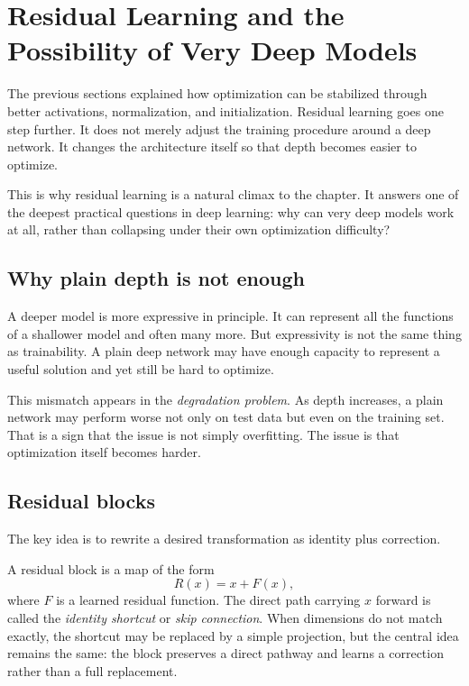 \section{Residual Learning and the Possibility of Very Deep Models}
\thispagestyle{plain}

The previous sections explained how optimization can be stabilized through better activations, normalization, and initialization.
Residual learning goes one step further.
It does not merely adjust the training procedure around a deep network.
It changes the architecture itself so that depth becomes easier to optimize.

\medskip

This is why residual learning is a natural climax to the chapter.
It answers one of the deepest practical questions in deep learning:
why can very deep models work at all, rather than collapsing under their own optimization difficulty?

\subsection*{Why plain depth is not enough}

A deeper model is more expressive in principle.
It can represent all the functions of a shallower model and often many more.
But expressivity is not the same thing as trainability.
A plain deep network may have enough capacity to represent a useful solution and yet still be hard to optimize.

\medskip

This mismatch appears in the \emph{degradation problem}.
As depth increases, a plain network may perform worse not only on test data but even on the training set.
That is a sign that the issue is not simply overfitting.
The issue is that optimization itself becomes harder.


\subsection*{Residual blocks}

The key idea is to rewrite a desired transformation as identity plus correction.

\begin{definition}
A residual block is a map of the form
\[
R(x)=x+F(x),
\]
where $F$ is a learned residual function.
The direct path carrying $x$ forward is called the \emph{identity shortcut} or \emph{skip connection}.
When dimensions do not match exactly, the shortcut may be replaced by a simple projection, but the central idea remains the same: the block preserves a direct pathway and learns a correction rather than a full replacement.
\end{definition}

